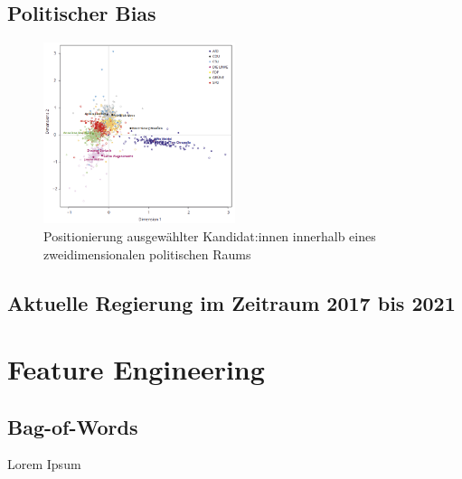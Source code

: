 \subsection{Politischer Bias}

\begin{figure}[H]
    \centering
    \includegraphics[width=0.5\textwidth]{images/positionierung_ausgewaehlter_kandidaten.png}
    \caption[Positionierung ausgewählter Kandidat:innen]{Positionierung ausgewählter Kandidat:innen innerhalb eines zweidimensionalen politischen Raums \autocite{saltzer_bundestagswahl_2022}} \label{fig:positionierungAusgewaehlterKanidaten}
\end{figure}

\subsection{Aktuelle Regierung im Zeitraum 2017 bis 2021}




\section{Feature Engineering}

\subsection{Bag-of-Words}

Lorem Ipsum

